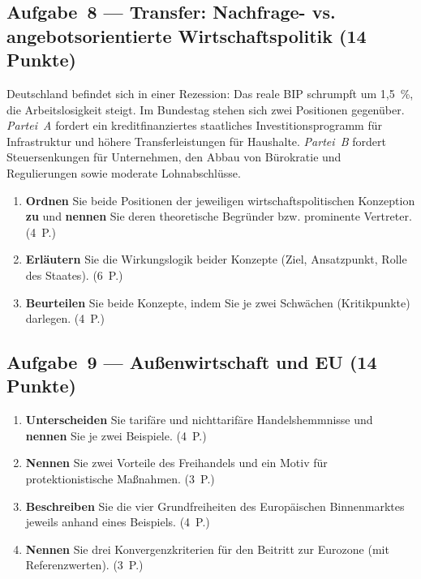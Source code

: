 \documentclass[11pt, a4paper]{article}
\begin{document}
\subsection*{Aufgabe~8 --- Transfer: Nachfrage- vs. angebotsorientierte Wirtschaftspolitik (14 Punkte)}

Deutschland befindet sich in einer Rezession: Das reale BIP schrumpft um 1,5~\%, die
Arbeitslosigkeit steigt. Im Bundestag stehen sich zwei Positionen gegenüber.
\emph{Partei~A} fordert ein kreditfinanziertes staatliches Investitionsprogramm für
Infrastruktur und höhere Transferleistungen für Haushalte. \emph{Partei~B} fordert
Steuersenkungen für Unternehmen, den Abbau von Bürokratie und Regulierungen sowie moderate
Lohnabschlüsse.

\begin{enumerate}[label=(\alph*)]
  \item \textbf{Ordnen} Sie beide Positionen der jeweiligen wirtschaftspolitischen
    Konzeption \textbf{zu} und \textbf{nennen} Sie deren theoretische Begründer bzw.
    prominente Vertreter. \hfill (4~P.)
  \item \textbf{Erläutern} Sie die Wirkungslogik beider Konzepte (Ziel, Ansatzpunkt, Rolle
    des Staates). \hfill (6~P.)
  \item \textbf{Beurteilen} Sie beide Konzepte, indem Sie je zwei Schwächen (Kritikpunkte)
    darlegen. \hfill (4~P.)
\end{enumerate}

\subsection*{Aufgabe~9 --- Außenwirtschaft und EU (14 Punkte)}

\begin{enumerate}[label=(\alph*)]
  \item \textbf{Unterscheiden} Sie tarifäre und nichttarifäre Handelshemmnisse und
    \textbf{nennen} Sie je zwei Beispiele. \hfill (4~P.)
  \item \textbf{Nennen} Sie zwei Vorteile des Freihandels und ein Motiv für
    protektionistische Maßnahmen. \hfill (3~P.)
  \item \textbf{Beschreiben} Sie die vier Grundfreiheiten des Europäischen Binnenmarktes
    jeweils anhand eines Beispiels. \hfill (4~P.)
  \item \textbf{Nennen} Sie drei Konvergenzkriterien für den Beitritt zur Eurozone (mit
    Referenzwerten). \hfill (3~P.)
\end{enumerate}
\end{document}
